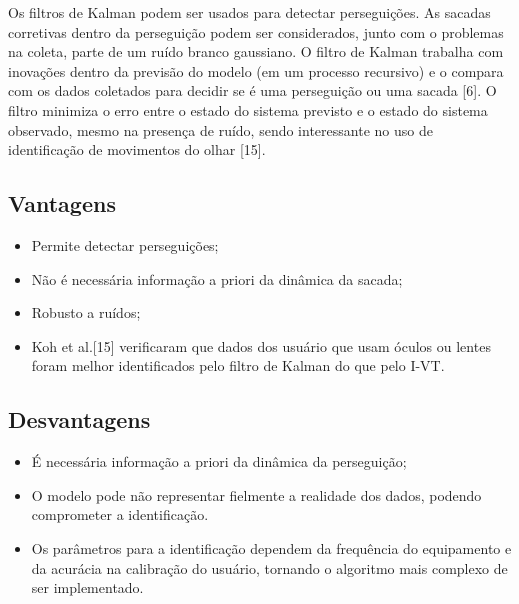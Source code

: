 \documentclass[brazil,]{report}
\begin{document}
Os filtros de Kalman podem ser usados para detectar perseguições. As
sacadas corretivas dentro da perseguição podem ser considerados, junto
com o problemas na coleta, parte de um ruído branco gaussiano. O filtro
de Kalman trabalha com inovações dentro da previsão do modelo (em um
processo recursivo) e o compara com os dados coletados para decidir se é
uma perseguição ou uma sacada {[}6{]}. O filtro minimiza o erro entre o
estado do sistema previsto e o estado do sistema observado, mesmo na
presença de ruído, sendo interessante no uso de identificação de
movimentos do olhar {[}15{]}.

\subsection{Vantagens}\label{vantagens-10}

\begin{itemize}
\itemsep1pt\parskip0pt
\item
  Permite detectar perseguições;
\item
  Não é necessária informação a priori da dinâmica da sacada;
\item
  Robusto a ruídos;
\item
  Koh et al.{[}15{]} verificaram que dados dos usuário que usam óculos
  ou lentes foram melhor identificados pelo filtro de Kalman do que pelo
  \gls{I-VT}.
\end{itemize}

\subsection{Desvantagens}\label{desvantagens-10}

\begin{itemize}
\itemsep1pt\parskip0pt
\item
  É necessária informação a priori da dinâmica da perseguição;
\item
  O modelo pode não representar fielmente a realidade dos dados, podendo
  comprometer a identificação.
\item
  Os parâmetros para a identificação dependem da frequência do
  equipamento e da acurácia na calibração do usuário, tornando o
  algoritmo mais complexo de ser implementado.
\end{itemize}

\end{document}
